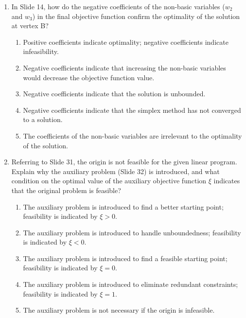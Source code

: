 \documentclass{article}%
\begin{document}
\begin{enumerate}
\begin{enumerate}
\begin{enumerate}
\item $ x_2 $ leaves, $ w_2 $ enters; then $ x_1 $ leaves, $ w_3 $ enters; $ x_1 = 0, x_2 = 0 $%
\end{enumerate}%
\vspace{0.5em}%
\item In Slide 14, how do the negative coefficients of the non-basic variables ($ w_2 $ and $ w_3 $) in the final objective function confirm the optimality of the solution at vertex B?%
\begin{enumerate}%
\item Positive coefficients indicate optimality; negative coefficients indicate infeasibility.%
\item Negative coefficients indicate that increasing the non-basic variables would decrease the objective function value.%
\item Negative coefficients indicate that the solution is unbounded.%
\item Negative coefficients indicate that the simplex method has not converged to a solution.%
\item The coefficients of the non-basic variables are irrelevant to the optimality of the solution.%
\end{enumerate}%
\vspace{0.5em}%
\item Referring to Slide 31, the origin is not feasible for the given linear program. Explain why the auxiliary problem (Slide 32) is introduced, and what condition on the optimal value of the auxiliary objective function $ \xi $ indicates that the original problem is feasible?%
\begin{enumerate}%
\item The auxiliary problem is introduced to find a better starting point; feasibility is indicated by $ \xi > 0 $.%
\item The auxiliary problem is introduced to handle unboundedness; feasibility is indicated by $ \xi < 0 $.%
\item The auxiliary problem is introduced to find a feasible starting point; feasibility is indicated by $ \xi = 0 $.%
\item The auxiliary problem is introduced to eliminate redundant constraints; feasibility is indicated by $ \xi = 1 $.%
\item The auxiliary problem is not necessary if the origin is infeasible.%
\end{enumerate}%
\vspace{0.5em}%
\end{enumerate}%
\end{enumerate}
\end{document}
